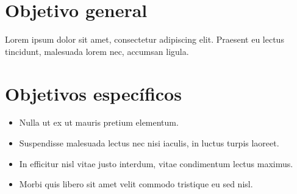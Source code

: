 \section{Objetivo general}
Lorem ipsum dolor sit amet, consectetur adipiscing elit. Praesent eu lectus tincidunt, malesuada lorem nec, accumsan ligula.

\section{Objetivos específicos}
\begin{itemize}
\item Nulla ut ex ut mauris pretium elementum.
\item Suspendisse malesuada lectus nec nisi iaculis, in luctus turpis laoreet.
\item In efficitur nisl vitae justo interdum, vitae condimentum lectus maximus.
\item Morbi quis libero sit amet velit commodo tristique eu sed nisl.
\end{itemize}
